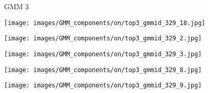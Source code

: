 \documentclass[10pt,twocolumn,letterpaper]{article}
\begin{document}
\begin{figure*}[t]
    
    \begin{minipage}[b]{0.005\textwidth}
    	\centering
    	\begin{turn}{90}
    GMM 3
    	\end{turn}
    	\vspace{2ex}
    \end{minipage}
    \hspace{0.01\textwidth}
    \begin{minipage}[b]{0.18\textwidth}
    	\centering
       	\texttt{[image: images/GMM\_components/on/top3\_gmmid\_329\_18.jpg]}
    \end{minipage}
    \hspace{0.005\textwidth}
    \begin{minipage}[b]{0.18\textwidth}
    	\centering
       	\texttt{[image: images/GMM\_components/on/top3\_gmmid\_329\_2.jpg]}
    \end{minipage}
    \hspace{0.005\textwidth}
    \begin{minipage}[b]{0.18\textwidth}
    	\centering
       	\texttt{[image: images/GMM\_components/on/top3\_gmmid\_329\_3.jpg]}
    \end{minipage}
    \hspace{0.005\textwidth}
	\begin{minipage}[b]{0.18\textwidth}
    	\centering
       	\texttt{[image: images/GMM\_components/on/top3\_gmmid\_329\_8.jpg]}
    \end{minipage}
    \hspace{0.005\textwidth}
    \begin{minipage}[b]{0.18\textwidth}
    	\centering
       	\texttt{[image: images/GMM\_components/on/top3\_gmmid\_329\_9.jpg]}
    \end{minipage}     





\end{figure*}
\end{document}
